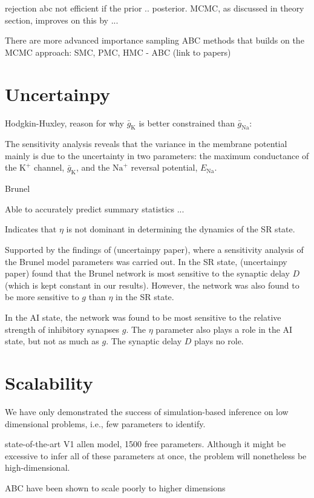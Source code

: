 rejection abc not efficient if the prior .. posterior. MCMC, as discussed in theory section, improves on this by ... 

There are more advanced importance sampling ABC methods that builds on the MCMC approach: SMC, PMC, HMC - ABC (link to papers)


\section{Uncertainpy}

Hodgkin-Huxley, reason for why $\bar{g}_\mathrm{K}$ is better constrained than $\bar{g}_\mathrm{Na}$:

The sensitivity analysis reveals that the variance in the membrane potential mainly is due to the uncertainty in two parameters: the maximum conductance of the $\mathrm{K}^+$ channel, $\bar{g}_\mathrm{K}$, and the $\mathrm{Na}^+$ reversal potential, $E_\mathrm{Na}$.

Brunel 

Able to accurately predict summary statistics ...

Indicates that $\eta$ is not dominant in determining the dynamics of the SR state. 

Supported by the findings of (uncertainpy paper), where a sensitivity analysis of the Brunel model parameters was carried out. In the SR state, (uncertainpy paper) found that the Brunel network is most sensitive to the synaptic delay $D$ (which is kept constant in our results). However, the network was also found to be more sensitive to $g$ than $\eta$ in the SR state. 

In the AI state, the network was found to be most sensitive to the relative strength of inhibitory synapses $g$. The $\eta$ parameter also plays a role in the AI state, but not as much as $g$. The synaptic delay $D$ plays no role. 

\section{Scalability}

We have only demonstrated the success of simulation-based inference on low dimensional problems, i.e., few parameters to identify. 

state-of-the-art V1 allen model, 1500 free parameters. Although it might be excessive to infer all of these parameters at once, the problem will nonetheless be high-dimensional. 

ABC have been shown to scale poorly to higher dimensions

